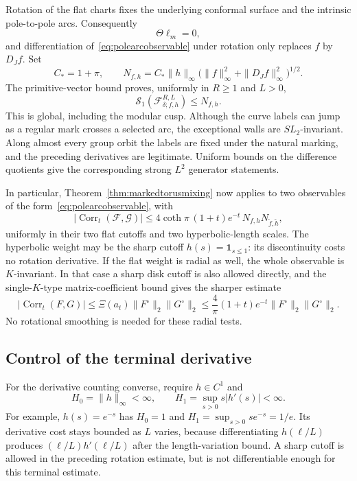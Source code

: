 Rotation of the flat charts fixes the underlying conformal surface and
the intrinsic pole-to-pole arcs. Consequently
\[
 \Theta\ell_m=0,
\]
and differentiation of~\eqref{eq:polearcobservable} under rotation
only replaces $f$ by $D_Jf$. Set
\[
 C_*=1+\pi,\qquad
 N_{f,h}=C_*\|h\|_\infty
             \bigl(\|f\|_\infty^2+\|D_Jf\|_\infty^2\bigr)^{1/2}.
\]
The primitive-vector bound proves, uniformly in $R\geq1$ and $L>0$,
\begin{equation}
 \mathcal S_1(\mathcal F_{\delta;f,h}^{R,L})\leq N_{f,h}.
 \label{eq:polearcuniformS1}
\end{equation}
This is global, including the modular cusp. Although the curve labels
can jump as a regular mark crosses a selected arc, the exceptional walls
are $SL_2$-invariant. Along almost every group orbit the labels are fixed
under the natural marking, and the preceding derivatives are legitimate.
Uniform bounds on the difference quotients give the corresponding strong
$L^2$ generator statements.

In particular, Theorem~\ref{thm:markedtorusmixing} now applies to two
observables of the form~\eqref{eq:polearcobservable}, with
\begin{equation}
 |\operatorname{Corr}_t(\mathcal F,\mathcal G)|
 \leq4\coth\pi\,(1+t)e^{-t}\,N_{f,h}N_{\widetilde f,\widetilde h},
 \label{eq:polearccorrelation}
\end{equation}
uniformly in their two flat cutoffs and two hyperbolic-length scales.
The hyperbolic weight may be the sharp cutoff
$h(s)=\mathbf1_{s\leq1}$: its discontinuity costs no rotation derivative.
If the flat weight is radial as well, the whole observable is
$K$-invariant. In that case a sharp disk cutoff is also allowed directly,
and the single-$K$-type matrix-coefficient bound gives the sharper estimate
\begin{equation}
 |\operatorname{Corr}_t(F,G)|
 \leq\Xi(a_t)\|F^\circ\|_2\|G^\circ\|_2
 \leq\frac4\pi(1+t)e^{-t}\|F^\circ\|_2\|G^\circ\|_2.
 \label{eq:polearcKfixedcorrelation}
\end{equation}
No rotational smoothing is needed for these radial tests.

\subsection{Control of the terminal derivative}
\label{subsec:polearcterminal}

For the derivative counting converse, require $h\in C^1$ and
\[
 H_0=\|h\|_\infty<\infty,\qquad
 H_1=\sup_{s>0}s|h'(s)|<\infty.
\]
For example, $h(s)=e^{-s}$ has $H_0=1$ and
$H_1=\sup_{s>0}se^{-s}=1/e$. Its derivative cost stays bounded
as $L$ varies, because differentiating $h(\ell/L)$ produces
$(\ell/L)h'(\ell/L)$ after the length-variation bound.
A sharp cutoff is allowed in the preceding rotation estimate,
but is not differentiable enough for this terminal estimate.

